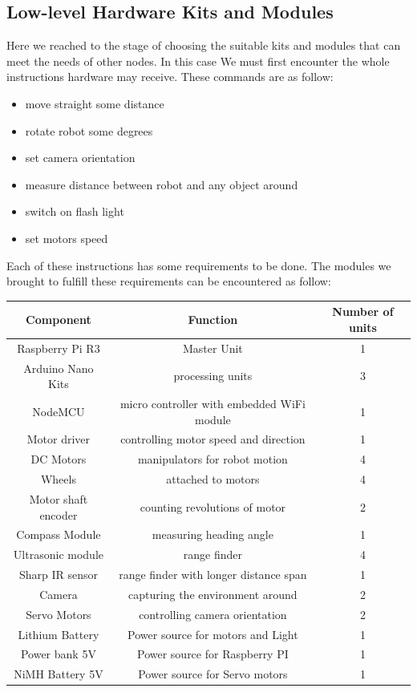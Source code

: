 \documentclass[12pt]{article}
\begin{document}
\subsection{Low-level Hardware Kits and Modules}
Here we reached to the stage of choosing the suitable kits and modules that can meet the needs of other nodes. In this case We must first encounter the whole instructions hardware may receive. These commands are as follow:
\begin{itemize}
	\item move straight some distance
	\item rotate robot some degrees
	\item set camera orientation
	\item measure distance between robot and any object around
	\item switch on flash light
	\item set motors speed
\end{itemize}
Each of these instructions has some requirements to be done. The modules we brought to fulfill these requirements can be encountered as follow:
\begin{center}
	\begin{tabular}{| c | c | c|}
		\hline
		Component & Function & Number of units \\
		\hline
		\hline
		Raspberry Pi R3 & Master Unit & 1\\
		\hline
		Arduino Nano Kits & processing units & 3\\
		\hline
		NodeMCU & micro controller with embedded WiFi module & 1\\
		\hline
		Motor driver & controlling motor speed and direction & 1\\
		\hline
		DC Motors & manipulators for robot motion & 4\\
		\hline
		Wheels & attached to motors & 4\\
		\hline
		Motor shaft encoder & counting revolutions of motor & 2\\
		\hline
		Compass Module & measuring heading angle & 1\\
		\hline
		Ultrasonic module & range finder & 4\\
		\hline
		Sharp IR sensor & range finder with longer distance span & 1\\
		\hline
		Camera & capturing the environment around & 2\\
		\hline
		Servo Motors & controlling camera orientation & 2\\
		\hline
		Lithium Battery & Power source for motors and Light & 1\\
		\hline
		Power bank 5V & Power source for Raspberry PI & 1\\
		\hline
		NiMH Battery 5V & Power source for Servo motors & 1\\
		\hline
	\end{tabular}
\end{center}
\end{document}
